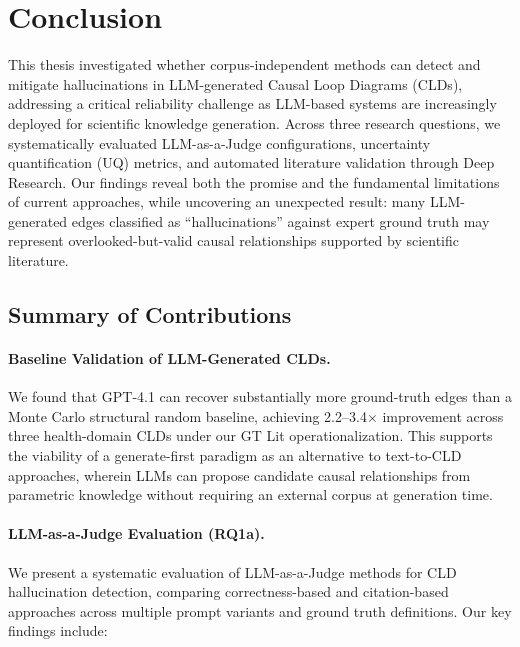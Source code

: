 \section{Conclusion}
\label{sec:conclusion}

This thesis investigated whether corpus-independent methods can detect and mitigate hallucinations in LLM-generated Causal Loop Diagrams (CLDs), addressing a critical reliability challenge as LLM-based systems are increasingly deployed for scientific knowledge generation. Across three research questions, we systematically evaluated LLM-as-a-Judge configurations, uncertainty quantification (UQ) metrics, and automated literature validation through Deep Research. Our findings reveal both the promise and the fundamental limitations of current approaches, while uncovering an unexpected result: many LLM-generated edges classified as ``hallucinations'' against expert ground truth may represent overlooked-but-valid causal relationships supported by scientific literature.

\subsection{Summary of Contributions}
\label{sec:conclusion_contributions}

\paragraph{Baseline Validation of LLM-Generated CLDs.}
We found that GPT-4.1 can recover substantially more ground-truth edges than a Monte Carlo structural random baseline, achieving 2.2--3.4$\times$ improvement across three health-domain CLDs under our GT Lit operationalization. This supports the viability of a generate-first paradigm as an alternative to text-to-CLD approaches, wherein LLMs can propose candidate causal relationships from parametric knowledge without requiring an external corpus at generation time.

\paragraph{LLM-as-a-Judge Evaluation (RQ1a).}
We present a systematic evaluation of LLM-as-a-Judge methods for CLD hallucination detection, comparing correctness-based and citation-based approaches across multiple prompt variants and ground truth definitions. Our key findings include:

